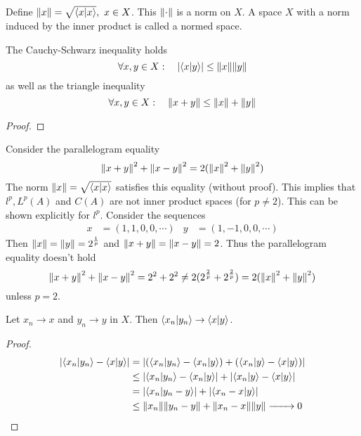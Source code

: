 \documentclass[../../script.tex]{subfiles}
\begin{document}
    \begin{defi}
        Define $\norm{x} = \sqrt{\innerproduct{x}}, ~x \in X$. This $\norm{\cdot}$ is a norm on $X$. A space $X$ with a norm induced by the inner product is called a normed space.
    \end{defi}

    \begin{lem}
        The Cauchy-Schwarz inequality holds
        \[
            \forall x, y \in X: \quad \abs{\innerproduct{x}{y}} \le \norm{x}\norm{y}
        \]
        as well as the triangle inequality 
        \[
            \forall x, y \in X: \quad \norm{x + y} \le \norm{x} + \norm{y}
        \]
    \end{lem}
    \begin{proof}
        \noproof
    \end{proof}

    \begin{rem}
        Consider the parallelogram equality 
        \[
            \norm{x + y}^2 + \norm{x - y}^2 = 2(\norm{x}^2 + \norm{y}^2)
        \]
        The norm $\norm{x} = \sqrt{\innerproduct{x}}$ satisfies this equality (without proof). This implies that $l^p, L^p(A)$ and $C(A)$ are not inner product spaces (for $p \ne 2$).
        This can be shown explicitly for $l^p$. Consider the sequences 
        \begin{align*}
            x &= (1, 1, 0, 0, \cdots) & y &= (1, -1, 0, 0, \cdots)
        \end{align*}
        Then $\norm{x} = \norm{y} = 2^{\frac{1}{p}}$ and $\norm{x + y} = \norm{x - y} = 2$.
        Thus the parallelogram equality doesn't hold 
        \[
            \norm{x + y}^2 + \norm{x - y}^2 = 2^2 + 2^2 \ne 2(2^{\frac{2}{p}} + 2^{\frac{2}{p}}) = 2(\norm{x}^2 + \norm{y}^2)
        \]
        unless $p = 2$.
    \end{rem}

    \begin{lem}
        Let $x_n \rightarrow x$ and $y_n \rightarrow y$ in $X$. Then $\innerproduct{x_n}{y_n} \rightarrow \innerproduct{x}{y}$.
    \end{lem}
    \begin{proof}
        \begin{equation}
            \begin{split}
                \abs{\innerproduct{x_n}{y_n} - \innerproduct{x}{y}} &= \abs{(\innerproduct{x_n}{y_n} - \innerproduct{x_n}{y}) + (\innerproduct{x_n}{y} - \innerproduct{x}{y})} \\
                &\le \abs{\innerproduct{x_n}{y_n} - \innerproduct{x_n}{y}} + \abs{\innerproduct{x_n}{y} - \innerproduct{x}{y}} \\
                &= \abs{\innerproduct{x_n}{y_n - y}} + \abs{\innerproduct{x_n - x}{y}} \\
                &\le \norm{x_n} \norm{y_n - y} + \norm{x_n - x}\norm{y} \conv{} 0
            \end{split}
        \end{equation}
    \end{proof}
\end{document}
